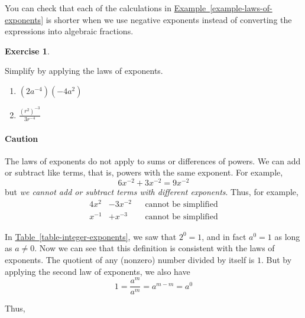 \documentclass[10pt,]{book}
\theoremstyle{plain}
\theoremstyle{definition}
\theoremstyle{definition}
\theoremstyle{definition}
\theoremstyle{definition}
\theoremstyle{definition}
\newtheorem{exercise}[theorem]{Exercise}
\numberwithin{equation}{section}
\newcommand{\amp}{ & }
\begin{document}
    You can check that each of the calculations in \hyperref[example-laws-of-exponents]{Example~\ref{example-laws-of-exponents}} is shorter when we use negative exponents instead of converting the expressions into algebraic fractions.
%
\begin{exercise}\label{exercise-laws-of-exponents}

    Simplify by applying the laws of exponents.
    \leavevmode%
\begin{enumerate}[label=\alph**a]
\item\hypertarget{li-458}{}\(\left(2a^{−4}\right) \left(−4a^2\right)\)\item\hypertarget{li-459}{}\(\frac{(r^2)^{−3}}{3r^{−4}}\)\end{enumerate}

%
\end{exercise}
\typeout{************************************************}
\typeout{************************************************}
\paragraph[Caution]{Caution}\label{paragraphs-46}

    The laws of exponents do not apply to sums or differences of powers. We can add or subtract like terms, that is, powers with the same exponent. For example,
    \begin{equation*}6x^{−2} + 3x^{−2} = 9x^{−2}\end{equation*}
    but \emph{we cannot add or subtract terms with different exponents}. Thus, for example,
    \begin{align*}
    4x^2 \amp− 3x^{−2} \amp\amp \text{cannot be simplified}\\
    x^{−1} \amp + x^{−3}\amp\amp \text{cannot be simplified}
    \end{align*}
%
\par

    In \hyperref[table-integer-exponents]{Table~\ref{table-integer-exponents}}, we saw that \(2^0 = 1\), and in fact \(a^0 = 1\) as long as \(a \ne 0\). Now we can see that this definition is consistent with the laws of exponents. The quotient of any (nonzero) number divided by itself is \(1\). But by applying the second law of exponents, we also have
    \begin{equation*}1 = \frac{a^m}{a^m}= a^{m−m} = a^0\end{equation*}
%
\par
Thus,%
\typeout{************************************************}
\typeout{************************************************}
\end{document}
